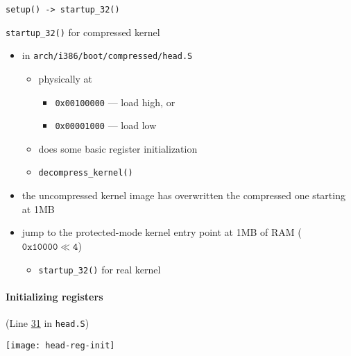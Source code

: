 \begin{frame}{\texttt{setup() -> startup\_32()}}%
  \begin{block}{\texttt{startup\_32()} for compressed kernel}
    \begin{itemize}
    \item in \texttt{arch/i386/boot/compressed/head.S}
      \begin{itemize}
      \item physically at
        \begin{itemize}
        \item[]\texttt{0x00100000} --- load high, or
        \item[]\texttt{0x00001000} --- load low
        \end{itemize}
      \item does some basic register initialization
      \item \texttt{decompress\_kernel()}
      \end{itemize}
    \item the uncompressed kernel image has overwritten the compressed one starting at 1MB
    \item jump to the protected-mode kernel entry point at 1MB of RAM ($\mathtt{0x10000\ll 4}$)
      \begin{itemize}
      \item \texttt{startup\_32()} for real kernel
      \end{itemize}
    \end{itemize}
  \end{block}
\end{frame}

\paragraph{Initializing registers}
(Line \href{http://lxr.linux.no/linux+v2.6.11/arch/i386/boot/compressed/head.S\#L31}{31}
in \texttt{head.S})

\begin{center}
  \texttt{[image: head-reg-init]}
\end{center}


